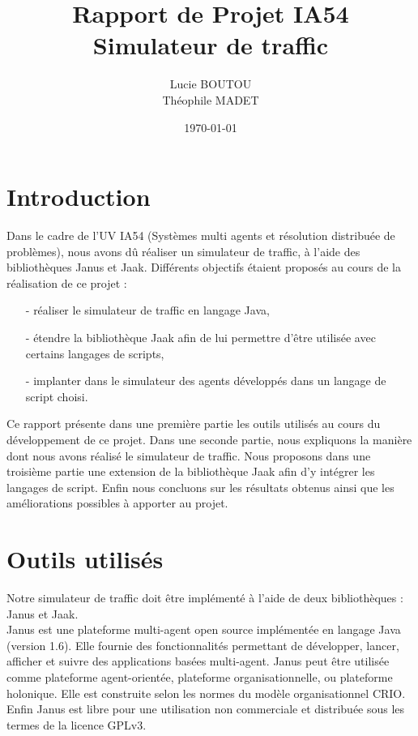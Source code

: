 \documentclass[a4paper,12pt]{report}
\title{Rapport de Projet IA54 \\ Simulateur de traffic}
\author{Lucie BOUTOU \\ Théophile MADET}
\date{\today}
\begin{document}
\setcounter{page}{2}
\tableofcontents

\newpage

\chapter{Introduction}

Dans le cadre de l'UV IA54 (Systèmes multi agents et résolution distribuée de problèmes), nous avons dû réaliser un simulateur de traffic, à l'aide des bibliothèques Janus et Jaak. Différents objectifs étaient proposés au cours de la réalisation de ce projet :\\
\begin{itemize}
 \item[-] réaliser le simulateur de traffic en langage Java,
 \item[-] étendre la bibliothèque Jaak afin de lui permettre d'être utilisée avec certains langages de scripts,
 \item[-] implanter dans le simulateur des agents développés dans un langage de script choisi.\\
\end{itemize}

Ce rapport présente dans une première partie les outils utilisés au cours du développement de ce projet. Dans une seconde partie, nous expliquons la manière dont nous avons réalisé le simulateur de traffic. Nous proposons dans une troisième partie une extension de la bibliothèque Jaak afin d'y intégrer les langages de script. Enfin nous concluons sur les résultats obtenus ainsi que les améliorations possibles à apporter au projet.

\chapter{Outils utilisés}

Notre simulateur de traffic doit être implémenté à l'aide de deux bibliothèques : Janus et Jaak.\\

Janus est une plateforme multi-agent open source implémentée en langage Java (version 1.6). Elle fournie des fonctionnalités permettant de développer, lancer, afficher et suivre des applications basées multi-agent. Janus peut être utilisée comme plateforme agent-orientée, plateforme organisationnelle, ou plateforme holonique. Elle est construite selon les normes du modèle organisationnel CRIO. Enfin Janus est libre pour une utilisation non commerciale et distribuée sous les termes de la licence GPLv3.\\
\end{document}
